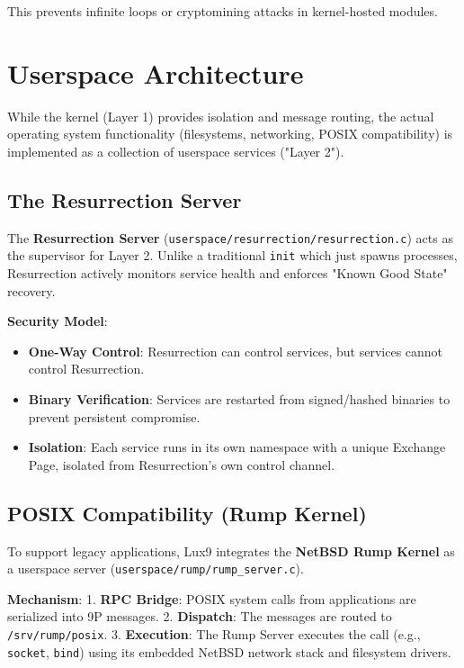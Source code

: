 \documentclass[11pt,letterpaper]{article}
\begin{document}
This prevents infinite loops or cryptomining attacks in kernel-hosted modules.

\section{Userspace Architecture}

While the kernel (Layer 1) provides isolation and message routing, the actual operating system functionality (filesystems, networking, POSIX compatibility) is implemented as a collection of userspace services ("Layer 2").

\subsection{The Resurrection Server}

The \textbf{Resurrection Server} (\texttt{userspace/resurrection/resurrection.c}) acts as the supervisor for Layer 2. Unlike a traditional \texttt{init} which just spawns processes, Resurrection actively monitors service health and enforces "Known Good State" recovery.

\textbf{Security Model}:
\begin{itemize}
\item \textbf{One-Way Control}: Resurrection can control services, but services cannot control Resurrection.
\item \textbf{Binary Verification}: Services are restarted from signed/hashed binaries to prevent persistent compromise.
\item \textbf{Isolation}: Each service runs in its own namespace with a unique Exchange Page, isolated from Resurrection's own control channel.
\end{itemize}

\subsection{POSIX Compatibility (Rump Kernel)}

To support legacy applications, Lux9 integrates the \textbf{NetBSD Rump Kernel} as a userspace server (\texttt{userspace/rump/rump_server.c}).

\textbf{Mechanism}:
1.  \textbf{RPC Bridge}: POSIX system calls from applications are serialized into 9P messages.
2.  \textbf{Dispatch}: The messages are routed to \texttt{/srv/rump/posix}.
3.  \textbf{Execution}: The Rump Server executes the call (e.g., \texttt{socket}, \texttt{bind}) using its embedded NetBSD network stack and filesystem drivers.
\end{document}
